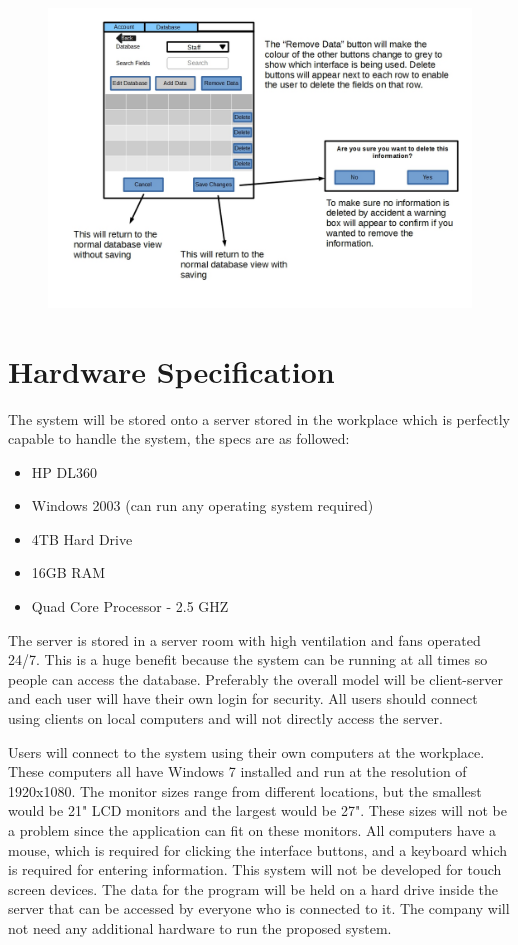 \begin{figure}[H]
\includegraphics[width=\textwidth,angle=90]{GUI_Design14.jpg}
\caption{}
\end{figure}


\section {Hardware Specification}

The system will be stored onto a server stored in the workplace which is perfectly capable to handle the system, the specs are as followed:
\begin{itemize}
\item HP DL360
\item Windows 2003 (can run any operating system required)
\item 4TB Hard Drive
\item 16GB RAM
\item Quad Core Processor - 2.5 GHZ
\end{itemize}
The server is stored in a server room with high ventilation and fans operated 24/7. This is a huge benefit because the system can be running at all times so people can access the database. Preferably the overall model will be client-server and each user will have their own login for security. All users should connect using clients on local computers and will not directly access the server.

Users will connect to the system using their own computers at the workplace. These computers all have Windows 7 installed and run at the resolution of 1920x1080. The monitor sizes range from different locations, but the smallest would be 21" LCD monitors and the largest would be 27". These sizes will not be a problem since the application can fit on these monitors. All computers have a mouse, which is required for clicking the interface buttons, and a keyboard which is required for entering information. This system will not be developed for touch screen devices. The data for the program will be held on a hard drive inside the server that can be accessed by everyone who is connected to it. The company will not need any additional hardware to run the proposed system.

